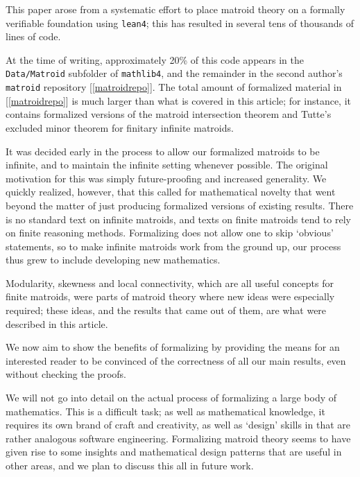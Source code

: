 \documentclass{amsart}
\theoremstyle{plain}
\theoremstyle{definition}
\newcommand{\smalltt}[1]{{\small\texttt{#1}}}
\begin{document}
This paper arose from a systematic effort to place matroid theory 
on a formally verifiable foundation using \smalltt{lean4}; 
this has resulted in several tens of thousands of lines of code.

At the time of writing, approximately 20\% of
this code appears in the \smalltt{Data/Matroid} subfolder of
\smalltt{mathlib4}, 
and the remainder in the second author's \smalltt{matroid} repository [\ref{matroidrepo}]. 
The total amount of formalized material in [\ref{matroidrepo}] is much larger
than what is covered in this article; for instance, it 
contains formalized versions of the matroid intersection theorem 
and Tutte's excluded minor theorem for finitary infinite matroids. 

It was decided early in the process to allow our formalized matroids to be infinite, 
and to maintain the infinite setting whenever possible. 
The original motivation for this was simply future-proofing and increased generality.
We quickly realized, however, that this called for mathematical novelty
that went beyond the matter of just producing formalized versions of existing results. 
There is no standard text on infinite matroids, and texts on finite matroids
tend to rely on finite reasoning methods.
Formalizing does not allow one to skip `obvious' statements, 
so to make infinite matroids work from the ground up,
our process thus grew to include developing new mathematics. 

Modularity, skewness and local connectivity, which are all useful concepts
for finite matroids, were parts of matroid theory where new ideas were especially required;
these ideas, and the results that came out of them,
are what were described in this article. 

We now aim to show the benefits of formalizing by  
providing the means for an interested reader to be convinced 
of the correctness of all our main results, even without checking the proofs. 

We will not go into detail on the actual process of formalizing a large 
body of mathematics. This is a difficult task; as well as mathematical
knowledge, it requires its own brand of craft and creativity, 
as well as `design' skills in that are rather analogous software engineering.
Formalizing matroid theory seems to have given rise to some insights 
and mathematical design patterns that are useful in other areas,
and we plan to discuss this all in future work. 
\end{document}
